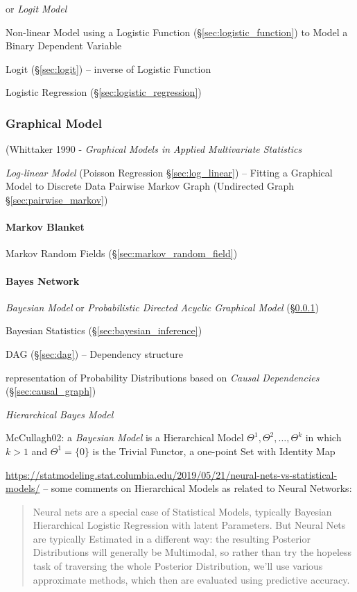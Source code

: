 or \emph{Logit Model}

Non-linear Model using a Logistic Function (\S\ref{sec:logistic_function}) to
Model a Binary Dependent Variable

Logit (\S\ref{sec:logit}) -- inverse of Logistic Function

Logistic Regression (\S\ref{sec:logistic_regression})



\subsubsection{Graphical Model}\label{sec:graphical_model}

(Whittaker 1990 - \emph{Graphical Models in Applied Multivariate Statistics}

\fist \emph{Log-linear Model} (Poisson Regression \S\ref{sec:log_linear}) --
Fitting a Graphical Model to Discrete Data \fist Pairwise Markov Graph
(Undirected Graph \S\ref{sec:pairwise_markov})



\paragraph{Markov Blanket}\label{sec:markov_blanket}\hfill

Markov Random Fields (\S\ref{sec:markov_random_field})



\paragraph{Bayes Network}\label{sec:bayes_network}\hfill

\emph{Bayesian Model} or \emph{Probabilistic Directed Acyclic Graphical Model}
(\S\ref{sec:graphical_model})

Bayesian Statistics (\S\ref{sec:bayesian_inference})

DAG (\S\ref{sec:dag}) -- Dependency structure

representation of Probability Distributions based on \emph{Causal Dependencies}
(\S\ref{sec:causal_graph})

\emph{Hierarchical Bayes Model}

McCullagh02: a \emph{Bayesian Model} is a Hierarchical Model
$\Theta^1, \Theta^2, \ldots, \Theta^k$ in which $k > 1$ and $\Theta^1 = \{0\}$
is the Trivial Functor, a one-point Set with Identity Map

\url{https://statmodeling.stat.columbia.edu/2019/05/21/neural-nets-vs-statistical-models/}
-- some comments on Hierarchical Models as related to Neural Networks:
\begin{quote}
  Neural nets are a special case of Statistical Models, typically Bayesian
  Hierarchical Logistic Regression with latent Parameters. But Neural Nets are
  typically Estimated in a different way: the resulting Posterior Distributions
  will generally be Multimodal, so rather than try the hopeless task of
  traversing the whole Posterior Distribution, we’ll use various approximate
  methods, which then are evaluated using predictive accuracy.
\end{quote}

